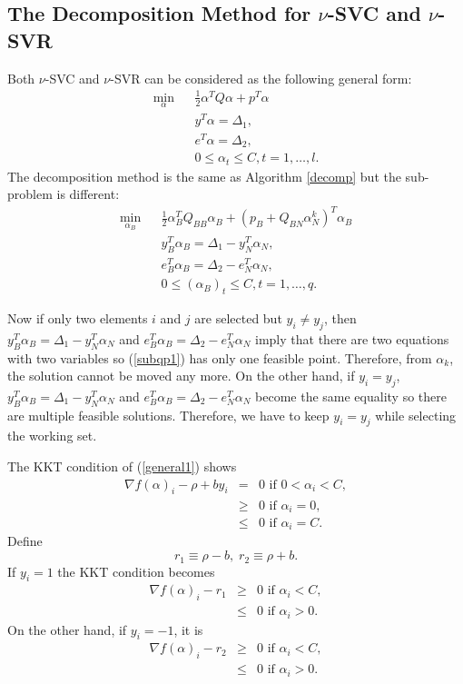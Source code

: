 \documentclass[11pt]{article}
\theoremstyle{break}
\begin{document}
\subsection{The Decomposition Method
for $\nu$-SVC and $\nu$-SVR}

Both $\nu$-SVC and $\nu$-SVR can be 
considered as the following general 
form:
\begin{eqnarray}
\min_{\alpha} && \frac{1}{2}
\alpha^T Q \alpha + p^T \alpha 
\nonumber \\
&& y^T \alpha = \Delta_1,
  \label{general1} \\
&& e^T \alpha = \Delta_2,
\nonumber \\
&& 0 \leq \alpha_t \leq C, t 
= 1, \ldots, l. \nonumber 
\end{eqnarray}
The decomposition method is the
same as Algorithm
\ref{decomp}
but the sub-problem is 
different:
\begin{eqnarray}
 \min_{\alpha_B} && \frac{1}{2} \alpha_B^T Q_{BB} \alpha_B +
(p_B + Q_{BN} \alpha_N^k)^T \alpha_B \nonumber \\
&& y_B^T \alpha_B = \Delta_1 -y_N^T \alpha_N,  \label{subqp1}  \\
&& e_B^T \alpha_B = \Delta_2 -e_N^T \alpha_N,   \nonumber\\
&& 0 \leq (\alpha_B)_t \leq C,  t = 1, \ldots, q.   \nonumber
\end{eqnarray}

Now if only two elements
$i$ and $j$ are selected but
$y_{i} \neq y_{j}$, then
$y_B^T \alpha_B = \Delta_1 -y_N^T \alpha_N$
and 
$e_B^T \alpha_B = \Delta_2 -e_N^T \alpha_N$
imply that there
are two equations with two variables
so
(\ref{subqp1}) has only one feasible point.
Therefore, from 
$\alpha_k$, the solution cannot
be moved any more.
On the other hand, if 
$y_{i} = y_{j}$,
$y_B^T \alpha_B = \Delta_1 -y_N^T \alpha_N$
and 
$e_B^T \alpha_B = \Delta_2 -e_N^T \alpha_N$
become the same equality so there are 
multiple feasible solutions.
Therefore,
we have to keep $y_{i} = 
y_{j}$ while selecting the working set.

The KKT condition
of (\ref{general1}) shows
\begin{eqnarray*}
\nabla f(\alpha)_i - \rho + by_i
& = & 0
\mbox{ if } 0 < \alpha_i < C, \\
& \geq & 0
\mbox{ if }  \alpha_i = 0, \\
& \leq & 0
\mbox{ if }  \alpha_i = C.
\end{eqnarray*}
Define
\begin{equation*}
r_1 \equiv \rho - b, \; 
r_2 \equiv \rho + b.
\end{equation*}
If $y_i = 1$ the KKT condition becomes
\begin{eqnarray}
\nabla f(\alpha)_i - r_1
& \geq & 0 
\mbox{ if }  \alpha_i < C, \label{y1free} \\
& \leq & 0 
\mbox{ if }  \alpha_i > 0. \nonumber
\end{eqnarray}
On the other hand, 
if $y_i = -1$, it is
\begin{eqnarray}
\nabla f(\alpha)_i - r_2
& \geq & 0 
\mbox{ if }  \alpha_i < C, \label{y2free} \\
& \leq & 0 
\mbox{ if }  \alpha_i > 0. \nonumber
\end{eqnarray}
\end{document}
